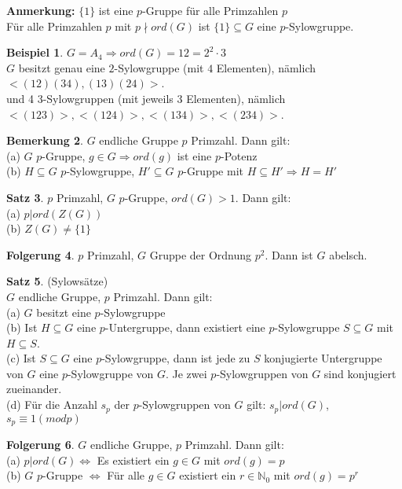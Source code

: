 \documentclass[10pt,a4paper,numbers=endperiod]{scrreprt}
\theoremstyle{definition}
\newtheorem{satz}{Satz}[section]
\newtheorem{bem}[satz]{Bemerkung}
\newtheorem{bsp}[satz]{Beispiel}
\newtheorem{folg}[satz]{Folgerung}
\def\NN{{\mathbb N}}
\begin{document}
\textbf{Anmerkung:} $\{1\}$ ist eine $p$-Gruppe für alle Primzahlen $p$\\
Für alle Primzahlen $p$ mit $p \nmid ord(G)$ ist $\{1\} \subseteq G$ eine $p$-Sylowgruppe.

\begin{bsp}
	$G = A_4 \Rightarrow ord(G) = 12 = 2^2\cdot3$\\
	$G$ besitzt genau eine $2$-Sylowgruppe (mit $4$ Elementen), nämlich $<(12) (34), (13) (24)>$.\\
	und 4 3-Sylowgruppen (mit jeweils 3 Elementen), nämlich $<(123)>, <(124)>, <(134)>, <(234)>$.
\end{bsp}

\begin{bem}
	$G$ endliche Gruppe $p$ Primzahl. Dann gilt:\\
	(a) $G$ $p$-Gruppe, $g \in G \Rightarrow ord(g)$ ist eine $p$-Potenz\\
	(b) $H \subseteq G$ $p$-Sylowgruppe, $H' \subseteq G$ $p$-Gruppe mit $H \subseteq H' \Rightarrow H = H'$
\end{bem}

\begin{satz}
	$p$ Primzahl, $G$ $p$-Gruppe, $ord(G) > 1$. Dann gilt:\\
	(a) $p|ord(Z(G))$\\
	(b) $Z(G) \neq \{1\}$
\end{satz}

\begin{folg}
	$p$ Primzahl, $G$ Gruppe der Ordnung $p^2$. Dann ist $G$ abelsch.
\end{folg}

\begin{satz}
	(Sylowsätze)\\
	$G$ endliche Gruppe, $p$ Primzahl. Dann gilt:\\
	(a) $G$ besitzt eine $p$-Sylowgruppe\\
	(b) Ist $H \subseteq G$ eine $p$-Untergruppe, dann existiert eine $p$-Sylowgruppe $S \subseteq G$ mit $H \subseteq S$.\\
	(c) Ist $S \subseteq G$ eine $p$-Sylowgruppe, dann ist jede zu $S$ konjugierte Untergruppe von $G$ eine $p$-Sylowgruppe von $G$. Je zwei $p$-Sylowgruppen von $G$ sind konjugiert zueinander.\\
	(d) Für die Anzahl $s_p$ der $p$-Sylowgruppen von $G$ gilt: $s_p|ord(G)$, $s_p \equiv 1 (mod p)$
\end{satz}

\begin{folg}
	$G$ endliche Gruppe, $p$ Primzahl. Dann gilt:\\
	(a) $p |ord(G) \Leftrightarrow$ Es existiert ein $g \in G$ mit $ord(g) = p$\\
	(b) $G$ $p$-Gruppe $\Leftrightarrow$ Für alle $g \in G$ existiert ein $r \in \NN_0$ mit $ord(g) = p^r$
\end{folg}
\end{document}
